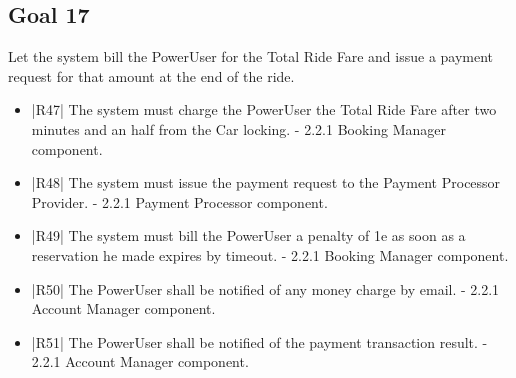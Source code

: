 \subsection {Goal 17} Let the system bill the PowerUser for the Total Ride Fare and issue a payment
request for that amount at the end of the ride.
\begin{itemize}
 \item |R47| The system must charge the PowerUser the Total Ride Fare after two minutes
and an half from the Car locking.
    \newline - 2.2.1 Booking Manager component.
 \item |R48| The system must issue the payment request to the Payment Processor Provider.
    \newline - 2.2.1 Payment Processor component.
 \item |R49| The system must bill the PowerUser a penalty of 1e as soon as a reservation
he made expires by timeout.
    \newline - 2.2.1 Booking Manager component.
 \item |R50| The PowerUser shall be notified of any money charge by email.
    \newline - 2.2.1 Account Manager component.
 \item |R51| The PowerUser shall be notified of the payment transaction result.
    \newline - 2.2.1 Account Manager component.
\end{itemize}

